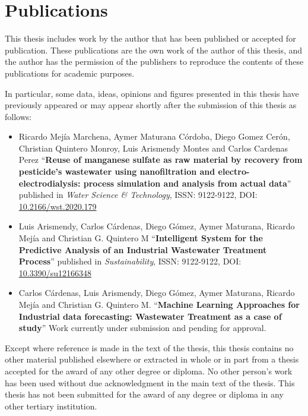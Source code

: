 \chapter*{Publications}

This thesis includes work by the author that has been published or accepted for publication. These publications are the own work of the author of this thesis, and the author has the permission of the publishers to reproduce the contents of these publications for academic purposes.

In particular, some data, ideas, opinions and figures presented in this thesis have previously appeared or may appear shortly after the submission of this thesis as follows:
\begin{itemize}


\item Ricardo Mejía Marchena, Aymer Maturana Córdoba, Diego Gomez Cerón, Christian Quintero Monroy, Luis Arismendy Montes and Carlos Cardenas Perez ``\textbf{Reuse of manganese sulfate as raw material by recovery from pesticide's wastewater using nanofiltration and electro-electrodialysis: process simulation and analysis from actual data}'' published in \emph{Water Science & Technology}, ISSN: 9122-9122, DOI: \href{https://iwaponline.com/wst/article/82/2/315/73680/Reuse-of-manganese-sulfate-as-raw-material-by}{10.2166/wst.2020.179}
  
\item Luis Arismendy, Carlos Cárdenas, Diego Gómez, Aymer Maturana, Ricardo Mejía and Christian G. Quintero M ``\textbf{Intelligent System for the Predictive Analysis of an Industrial Wastewater Treatment Process}'' published in \emph{Sustainability}, ISSN: 9122-9122, DOI: \href{https://www.mdpi.com/2071-1050/12/16/6348}{10.3390/su12166348}
  
\item Carlos Cárdenas, Luis Arismendy, Diego Gómez, Aymer Maturana, Ricardo Mejía and Christian G. Quintero M. ``\textbf{Machine Learning Approaches for Industrial data forecasting: Wastewater Treatment as a case of study}'' \textendash{} Work currently under submission and pending for approval. 
  
\end{itemize}
Except where reference is made in the text of the thesis, this thesis contains no other material published elsewhere or extracted in whole or in part from a thesis accepted for the award of any other degree or diploma. No other person's work has been used without due acknowledgment in the main text of the thesis. This thesis has not been submitted for the award of any degree or diploma in any other tertiary institution.

